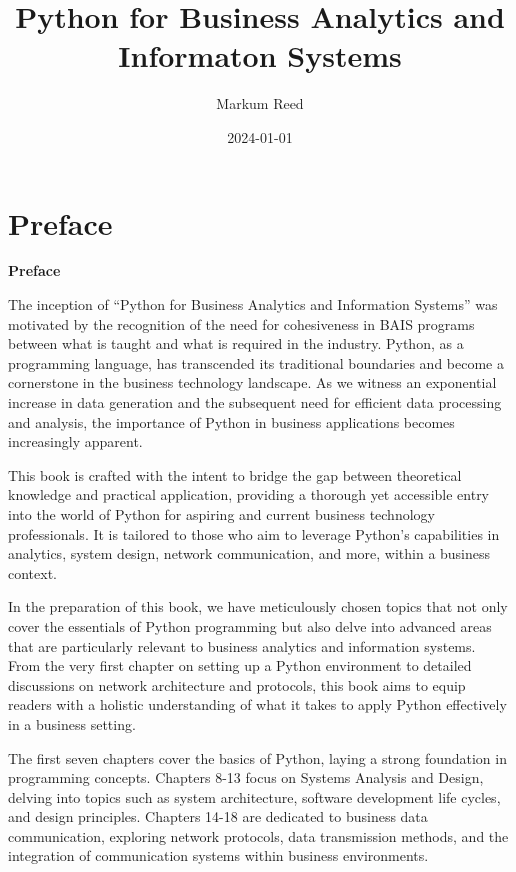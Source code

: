 \documentclass[
  letterpaper,
  DIV=11,
  numbers=noendperiod]{scrreprt}
\title{Python for Business Analytics and Informaton Systems}
\author{Markum Reed}
\date{2024-01-01}
\renewcommand*\contentsname{Table of contents}
\newcommand\contentsname{Table of contents}
\begin{document}
\maketitle

\renewcommand*\contentsname{Table of contents}
{
\hypersetup{linkcolor=}
\setcounter{tocdepth}{2}
\tableofcontents
}

\chapter*{Preface}\label{preface}


\textbf{Preface}

The inception of ``Python for Business Analytics and Information
Systems'' was motivated by the recognition of the need for cohesiveness
in BAIS programs between what is taught and what is required in the
industry. Python, as a programming language, has transcended its
traditional boundaries and become a cornerstone in the business
technology landscape. As we witness an exponential increase in data
generation and the subsequent need for efficient data processing and
analysis, the importance of Python in business applications becomes
increasingly apparent.

This book is crafted with the intent to bridge the gap between
theoretical knowledge and practical application, providing a thorough
yet accessible entry into the world of Python for aspiring and current
business technology professionals. It is tailored to those who aim to
leverage Python's capabilities in analytics, system design, network
communication, and more, within a business context.

In the preparation of this book, we have meticulously chosen topics that
not only cover the essentials of Python programming but also delve into
advanced areas that are particularly relevant to business analytics and
information systems. From the very first chapter on setting up a Python
environment to detailed discussions on network architecture and
protocols, this book aims to equip readers with a holistic understanding
of what it takes to apply Python effectively in a business setting.

The first seven chapters cover the basics of Python, laying a strong
foundation in programming concepts. Chapters 8-13 focus on Systems
Analysis and Design, delving into topics such as system architecture,
software development life cycles, and design principles. Chapters 14-18
are dedicated to business data communication, exploring network
protocols, data transmission methods, and the integration of
communication systems within business environments.
\end{document}

